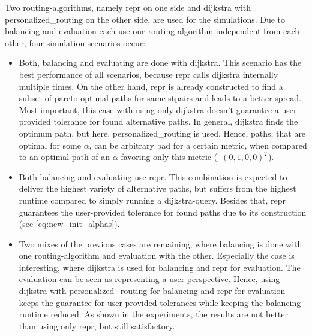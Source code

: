     Two routing-algorithms, namely \gls{repr} on one side and \gls{dijkstra} with \gls{personalized_routing} on the other side, are used for the simulations.
    Due to \gls{balancing} and evaluation each use one routing-algorithm independent from each other, four simulation-scenarios occur:
    \begin{itemize}
        \item Both, \gls{balancing} and evaluating are done with \gls{dijkstra}.
            This scenario has the best performance of all scenarios, because \gls{repr} calls \gls{dijkstra} internally multiple times.
            On the other hand, \gls{repr} is already constructed to find a subset of pareto-optimal paths for same \glspl{stpair} and leads to a better spread.
            Most important, this case with using only \gls{dijkstra} doesn't guarantee a user-provided tolerance for found alternative paths.
            In general, \gls{dijkstra} finds the optimum path, but here, \gls{personalized_routing} is used.
            Hence, paths, that are optimal for some $\alpha$, can be arbitrary bad for a certain \gls{metric}, when compared to an optimal path of an $\alpha$ favoring only this \gls{metric} (\eg\ $(0, 1, 0, 0)^T$).
        \item Both \gls{balancing} and evaluating use \gls{repr}.
            This combination is expected to deliver the highest variety of alternative paths, but suffers from the highest runtime compared to simply running a \gls{dijkstra}-query.
            Besides that, \gls{repr} guarantees the user-provided tolerance for found paths due to its construction (see \vref{eq:new_init_alphas}).
        \item Two mixes of the previous cases are remaining, where \gls{balancing} is done with one routing-algorithm and evaluation with the other.
            Especially the case is interesting, where \gls{dijkstra} is used for \gls{balancing} and \gls{repr} for evaluation.
            The evaluation can be seen as representing a user-perspective.
            Hence, using \gls{dijkstra} with \gls{personalized_routing} for \gls{balancing} and \gls{repr} for evaluation keeps the guarantee for user-provided tolerances while keeping the \gls{balancing}-runtime reduced.
            As shown in the experiments, the results are not better than using only \gls{repr}, but still satisfactory.
    \end{itemize}


